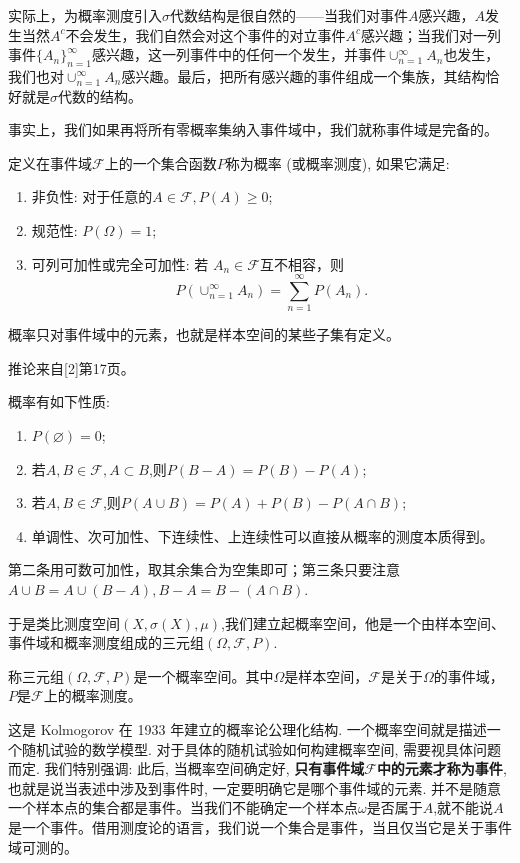 \documentclass[lang=cn,10pt]{elegantbook}
\begin{document}
	实际上，为概率测度引入\(\sigma\)代数结构是很自然的——当我们对事件\(A\)感兴趣，\(A\)发生当然\(A^c\)不会发生，我们自然会对这个事件的对立事件\(A^c\)感兴趣；当我们对一列事件\(\{A_n\}_{n=1}^\infty\)感兴趣，这一列事件中的任何一个发生，并事件\(\cup_{n=1}^\infty A_n\)也发生，我们也对\(\cup_{n=1}^\infty A_n\)感兴趣。最后，把所有感兴趣的事件组成一个集族，其结构恰好就是\(\sigma\)代数的结构。
	
	事实上，我们如果再将所有零概率集纳入事件域中，我们就称事件域是完备的。
	\begin{definition}[概率]
		定义在事件域\(\mathcal{F}\)上的一个集合函数\(P\)称为概率 (或概率测度), 如果它满足:
		\begin{enumerate}
			\item 非负性: 对于任意的\(A\in \mathcal{F},P(A)\ge 0\);
			\item 规范性: \(P(\Omega)=1\);
			\item 可列可加性或完全可加性: 若 \(A_n\in \mathcal{F}\)互不相容，则
			\[P(\cup_{n=1}^\infty A_n)=\sum_{n=1}^{\infty}P(A_n).\]
		\end{enumerate}
	\end{definition}
	\begin{note}
		概率只对事件域中的元素，也就是样本空间的某些子集有定义。
	\end{note}
	推论来自[2]第17页。
	\begin{corollary}
		概率有如下性质:
		\begin{enumerate}
			\item \(P(\varnothing)=0\);
			\item 若\(A,B\in \mathcal{F},A\subset B\),则\(P(B-A)=P(B)-P(A)\);
			\item 若\(A,B\in \mathcal{F}\),则\(P(A\cup B)=P(A)+P(B)-P(A\cap B)\);
			\item 单调性、次可加性、下连续性、上连续性可以直接从概率的测度本质得到。
		\end{enumerate}
		第二条用可数可加性，取其余集合为空集即可；第三条只要注意\(A\cup B=A\cup (B-A),B-A=B-(A\cap B)\).
	\end{corollary}
	于是类比测度空间\((X,\sigma(X),\mu)\),我们建立起概率空间，他是一个由样本空间、事件域和概率测度组成的三元组\((\Omega,\mathcal{F},P)\).
	\begin{definition}[概率空间]
		称三元组\((\Omega,\mathcal{F},P)\)是一个概率空间。其中\(\Omega\)是样本空间，\(\mathcal{F}\)是关于\(\Omega\)的事件域，\(P\)是\(\mathcal{F}\)上的概率测度。
	\end{definition}
	这是 Kolmogorov 在 1933 年建立的概率论公理化结构. 一个概率空间就是描述一个随机试验的数学模型. 对于具体的随机试验如何构建概率空间, 需要视具体问题而定. 我们特别强调: 此后, 当概率空间确定好, \textbf{只有事件域\(\mathcal{F}\)中的元素才称为事件}, 也就是说当表述中涉及到事件时, 一定要明确它是哪个事件域的元素. 并不是随意一个样本点的集合都是事件。当我们不能确定一个样本点\(\omega\)是否属于\(A\),就不能说\(A\)是一个事件。借用测度论的语言，我们说一个集合是事件，当且仅当它是关于事件域可测的。
	
\end{document}
